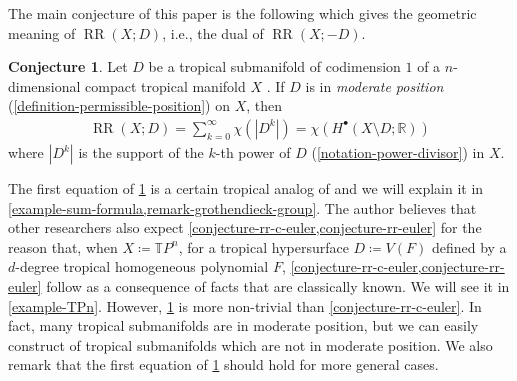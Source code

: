 \documentclass[a4paper,dvipdfmx,reqno,12pt]{amsart}
\theoremstyle{definition}
\newtheorem{conjecture}[theorem]{Conjecture}
\newcommand{\deq}{\coloneqq}
\newcommand{\opn}[1]{\operatorname{#1}}
\numberwithin{equation}{section}
\begin{document}
The main conjecture of this paper is the following 
which gives
the geometric meaning of $\opn{RR}(X;D)$, i.e.,
the dual of $\opn{RR}(X;-D)$.

\begin{conjecture}
\label{conjecture-rr-euler}
Let $D$ be a tropical submanifold of codimension 
$1$ of a $n$-dimensional compact tropical manifold $X$
\cite[Definition 2.14]{demedrano2023chern}.
If $D$ is in \emph{moderate position}
(\cref{definition-permissible-position}) on $X$,
then 
\begin{align}
\opn{RR}(X;D)=\sum_{k=0}^{\infty}\chi(|D^k|)
=\chi(H^{\bullet}(X\setminus D;\mathbb{R}))
\end{align}
where $|D^{k}|$ is the support of the $k$-th power
of $D$ (\cref{notation-power-divisor}) in $X$.
\end{conjecture}
The first equation of \cref{conjecture-rr-euler}
is a certain tropical analog of
\cite[. (14)]{MR1335917}
and we will explain it in \cref{example-sum-formula,remark-grothendieck-group}.
The author believes that other researchers also expect 
\cref{conjecture-rr-c-euler,conjecture-rr-euler} for 
the reason that,
when $X \deq \mathbb{T}P^n$,
for a tropical hypersurface $D \deq V(F)$
defined by a $d$-degree tropical homogeneous polynomial $F$, 
\cref{conjecture-rr-c-euler,conjecture-rr-euler}
follow as a consequence of facts
that are classically known.
We will see it in \cref{example-TPn}.
However,
\cref{conjecture-rr-euler} is more non-trivial than
\cref{conjecture-rr-c-euler}.
In fact, many tropical submanifolds are in moderate position,
but we can easily construct of tropical submanifolds
which are not in moderate position.
We also remark that the first equation of
\cref{conjecture-rr-euler} should hold for more general
cases.
\end{document}
